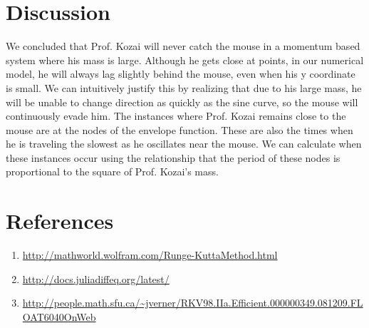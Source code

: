 \documentclass{article}
\begin{document}
\begin{multicols}{2}
  \section{Discussion}
  We concluded that Prof. Kozai will never catch the mouse in a momentum based system where his mass is large. Although he gets close at points, in our numerical model, he will always lag slightly behind the mouse, even when his y coordinate is small. We can intuitively justify this by realizing that due to his large mass, he will be unable to change direction as quickly as the sine curve, so the mouse will continuously evade him.
  The instances where Prof. Kozai remains close to the mouse are at the nodes of the envelope function. These are also the times when he is traveling the slowest as he oscillates near the mouse. We can calculate when these instances occur using the relationship that the period of these nodes is proportional to the square of Prof. Kozai’s mass.

  \section{References}
  \begin{enumerate}
  \item \url{http://mathworld.wolfram.com/Runge-KuttaMethod.html}
  \item \url{http://docs.juliadiffeq.org/latest/}
  \item \url{http://people.math.sfu.ca/~jverner/RKV98.IIa.Efficient.000000349.081209.FLOAT6040OnWeb}
  \end{enumerate}
\end{multicols}
\end{document}
